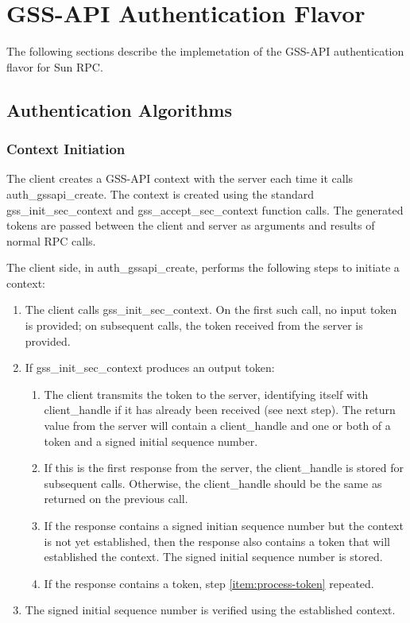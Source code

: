 \section{GSS-API Authentication Flavor}

The following sections describe the implemetation of the GSS-API
authentication flavor for Sun RPC.

\subsection{Authentication Algorithms}
\label{sec:algorithms}

\subsubsection{Context Initiation}

The client creates a GSS-API context with the server each time it
calls auth_gssapi_create.  The context is created using the standard
gss_init_sec_context and gss_accept_sec_context function calls.  The
generated tokens are passed between the client and server as arguments
and results of normal RPC calls.

The client side, in auth_gssapi_create, performs the following steps
to initiate a context:

\begin{enumerate}
\item\label{item:process-token} The client calls gss_init_sec_context.
On the first such call, no input token is provided; on subsequent
calls, the token received from the server is provided.

\item If gss_init_sec_context produces an output token:

\begin{enumerate}
\item The client transmits the token to the server, identifying itself
with client_handle if it has already been received (see next step).
The return value from the server will contain a client_handle and one
or both of a token and a signed initial sequence number.  

\item If this is the first response from the server, the client_handle
is stored for subsequent calls.  Otherwise, the client_handle should be
the same as returned on the previous call.

\item If the response contains a signed initian sequence number but
the context is not yet established, then the response also contains a
token that will established the context.  The signed initial sequence
number is stored.

\item If the response contains a token, step \ref{item:process-token}
repeated.
\end{enumerate}

\item The signed initial sequence number is verified using the
established context.
\end{enumerate}

